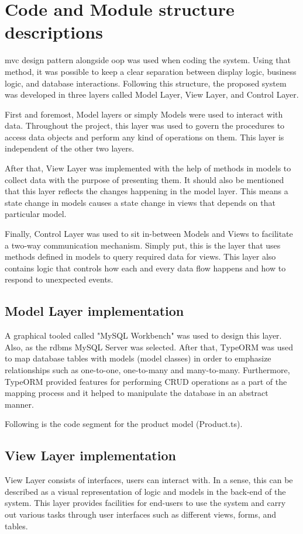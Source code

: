 \documentclass[12pt]{report}
\begin{document}
\section{Code and Module structure descriptions}
\acrshort{mvc} design pattern alongside \acrshort{oop} was used when coding the system. Using that method, it was possible to keep a clear separation between display logic, business logic, and database interactions. Following this structure, the proposed system was developed in three layers called Model Layer, View Layer, and Control Layer.

First and foremost, Model layers or simply Models were used to interact with data. Throughout the project, this layer was used to govern the procedures to access data objects and perform any kind of operations on them. This layer is independent of the other two layers.

After that, View Layer was implemented with the help of methods in models to collect data with the purpose of presenting them. It should also be mentioned that this layer reflects the changes happening in the model layer. This means a state change in models causes a state change in views that depends on that particular model.

Finally, Control Layer was used to sit in-between Models and Views to facilitate a two-way communication mechanism. Simply put, this is the layer that uses methods defined in models to query required data for views. This layer also contains logic that controls how each and every data flow happens and how to respond to unexpected events.

\subsection{Model Layer implementation}
A graphical tooled called "MySQL Workbench" was used to design this layer. Also, as the \acrshort{rdbms} MySQL Server was selected. After that, TypeORM was used to map database tables with models (model classes) in order to emphasize relationships such as one-to-one, one-to-many and many-to-many. Furthermore, TypeORM provided features for performing CRUD operations as a part of the mapping process and it helped to manipulate the database in an abstract manner.

\noindent
Following is the code segment for the product model (Product.ts).



\subsection{View Layer implementation}
View Layer consists of interfaces, users can interact with. In a sense, this can be described as a visual representation of logic and models in the back-end of the system. This layer provides facilities for end-users to use the system and carry out various tasks through user interfaces such as different views, forms, and tables.
\end{document}

